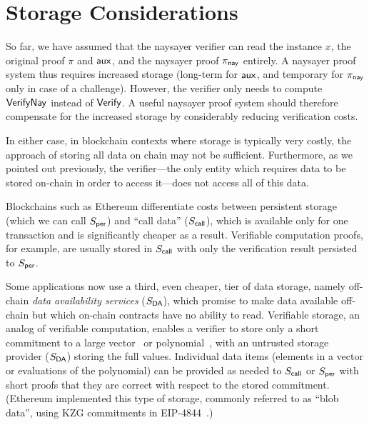 \section{Storage Considerations}\label{sec:naysayer_storage}

So far, we have assumed that the naysayer verifier can read the instance $x$, the original proof $\pi$ and $\mathsf{aux}$, and the naysayer proof $\pi_{\mathsf{nay}}$ entirely. A naysayer proof system thus requires increased storage (long-term for $\mathsf{aux}$, and temporary for $\pi_{\mathsf{nay}}$ only in case of a challenge). However, the verifier only needs to compute ${{\mathsf{Verify}}}\mathsf{Nay}$ instead of ${\mathsf{Verify}}$. A useful naysayer proof system should therefore compensate for the increased storage by considerably reducing verification costs.

In either case, in blockchain contexts where storage is typically very costly, the approach of storing all data on chain may not be sufficient. Furthermore, as we pointed out previously, the verifier---the only entity which requires data to be stored on-chain in order to access it---does not access all of this data.

Blockchains such as Ethereum differentiate costs between persistent storage (which we can call $S_{\sf per}$) and ``call data'' ($S_{\sf call}$), which is available only for one transaction and is significantly cheaper as a result. Verifiable computation proofs, for example, are usually stored in $S_{\sf call}$ with only the verification result persisted to $S_{\sf per}$.

Some applications now use a third, even cheaper, tier of data storage, namely off-chain \emph{data availability services} ($S_{\sf DA}$), which promise to make data available off-chain but which on-chain contracts have no ability to read. Verifiable storage, an analog of verifiable computation, enables a verifier to store only a short commitment to a large vector~\cite{PKC:CatFio13,C:Merkle87} or polynomial~\cite{AC:KatZavGol10}, with an untrusted storage provider ($S_{\sf DA}$) storing the full values. Individual data items (elements in a vector or evaluations of the polynomial) can be provided as needed to $S_{\sf call}$ or $S_{\sf per}$ with short proofs that they are correct with respect to the stored commitment. (Ethereum implemented this type of storage, commonly referred to as ``blob data'', using KZG commitments in EIP-4844~\cite{eip4844}.)

